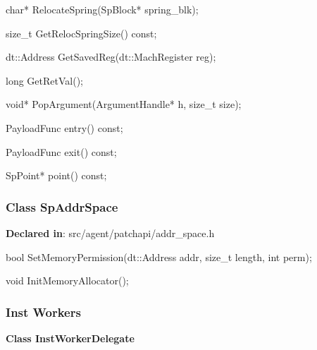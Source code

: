 \begin{apient}
char* RelocateSpring(SpBlock* spring_blk);
\end{apient}
\apidesc{
}

\begin{apient}
size_t GetRelocSpringSize() const;
\end{apient}
\apidesc{
}

\begin{apient}
dt::Address GetSavedReg(dt::MachRegister reg);
\end{apient}
\apidesc{
}

\begin{apient}
long GetRetVal();
\end{apient}
\apidesc{
}

\begin{apient}
void* PopArgument(ArgumentHandle* h, size_t size);
\end{apient}
\apidesc{
}

\begin{apient}
PayloadFunc entry() const;
\end{apient}
\apidesc{
}

\begin{apient}
PayloadFunc exit() const;
\end{apient}
\apidesc{
}

\begin{apient}
SpPoint* point() const;
\end{apient}
\apidesc{
}


\subsubsection{Class SpAddrSpace}
\textbf{Declared in}: src/agent/patchapi/addr\_space.h

\begin{apient}
bool SetMemoryPermission(dt::Address addr,
                         size_t length,
                         int perm);
\end{apient}
\apidesc{
}

\begin{apient}
void InitMemoryAllocator();
\end{apient}
\apidesc{
}

\subsubsection{Inst Workers}

\textbf{Class InstWorkerDelegate}

